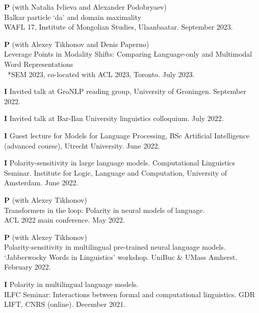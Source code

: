 \documentclass[12pt,letterpaper]{article}
\begin{document}
{\begin{hangparas}{.25in}{1}
\textbf{P} \hspace{2.5mm}  (with Natalia Ivlieva and Alexander Podobryaev)\\
Balkar particle `da' and domain maximality\\
WAFL 17, Institute of Mongolian Studies, Ulaanbaatar. September 2023.

\textbf{P} \hspace{2.5mm}  (with Alexey Tikhonov and Denis Paperno)\\
Leverage Points in Modality Shifts: Comparing Language-only and Multimodal Word Representations\\
\ *SEM 2023, co-located with ACL 2023, Toronto. July 2023.

\textbf{I} \hspace{2.5mm}  Invited talk at GroNLP reading group, University of Groningen. September 2022.

\textbf{I} \hspace{2.5mm}  Invited talk at Bar-Ilan University linguistics colloquium. July 2022.

\textbf{I} \hspace{2.08mm} Guest lecture for Models for Language Processing, BSc Artificial Intelligence (advanced course), Utrecht University. June 2022.

\textbf{I} \hspace{2.5mm} Polarity-sensitivity in large language models. Computational Linguistics Seminar. Institute for Logic, Language and Computation, University of Amsterdam. June 2022.

\textbf{P} \hspace{2.5mm}  (with Alexey Tikhonov) \\ Transformers in the loop: Polarity in neural models of language.\\
ACL 2022 main conference. May 2022.

\textbf{P} \hspace{2.5mm}  (with Alexey Tikhonov)\\ Polarity-sensitivity in multilingual pre-trained neural language models.\\
`Jabberwocky Words in Linguistics' workshop. UniBuc \& UMass Amherst. February 2022.

\textbf{I} \hspace{2.5mm}  Polarity in multilingual language models.\\
ILFC Seminar: Interactions between formal and computational linguistics. GDR LIFT, CNRS (online). December 2021.


\end{hangparas}}
\end{document}
